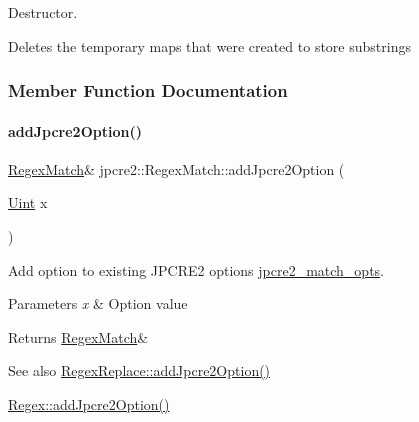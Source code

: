 Destructor. 

Deletes the temporary maps that were created to store substrings 

\subsubsection{Member Function Documentation}
\hypertarget{classjpcre2_1_1RegexMatch_a0a4cf8554a7e00f3cf2db34f60a43f60_a0a4cf8554a7e00f3cf2db34f60a43f60}{}\label{classjpcre2_1_1RegexMatch_a0a4cf8554a7e00f3cf2db34f60a43f60_a0a4cf8554a7e00f3cf2db34f60a43f60} 
\paragraph{\texorpdfstring{add\+Jpcre2\+Option()}{addJpcre2Option()}}
{\footnotesize\ttfamily \hyperlink{classjpcre2_1_1RegexMatch}{Regex\+Match}\& jpcre2\+::\+Regex\+Match\+::add\+Jpcre2\+Option (\begin{DoxyParamCaption}\item[{\hyperlink{namespacejpcre2_a078242d38221a13fb3543b9edd78c099}{Uint}}]{x }\end{DoxyParamCaption})\hspace{0.3cm}{\ttfamily [inline]}}



Add option to existing J\+P\+C\+R\+E2 options \hyperlink{classjpcre2_1_1RegexMatch_a70d62df887eeed237724f64fbc378700}{jpcre2\+\_\+match\+\_\+opts}. 


\begin{DoxyParams}{Parameters}
{\em x} & Option value \\
\hline
\end{DoxyParams}
\begin{DoxyReturn}{Returns}
\hyperlink{classjpcre2_1_1RegexMatch}{Regex\+Match}\& 
\end{DoxyReturn}
\begin{DoxySeeAlso}{See also}
\hyperlink{classjpcre2_1_1RegexReplace_a3f86b1e11d08d0153a08244771e59061_a3f86b1e11d08d0153a08244771e59061}{Regex\+Replace\+::add\+Jpcre2\+Option()} 

\hyperlink{classjpcre2_1_1Regex_a03974fa7ba8f7c47186cb8d6f54934de_a03974fa7ba8f7c47186cb8d6f54934de}{Regex\+::add\+Jpcre2\+Option()} 
\end{DoxySeeAlso}
\hypertarget{classjpcre2_1_1RegexMatch_a08c2e481fe8b9c001e67733fb4e33972_a08c2e481fe8b9c001e67733fb4e33972}{}\label{classjpcre2_1_1RegexMatch_a08c2e481fe8b9c001e67733fb4e33972_a08c2e481fe8b9c001e67733fb4e33972} 

